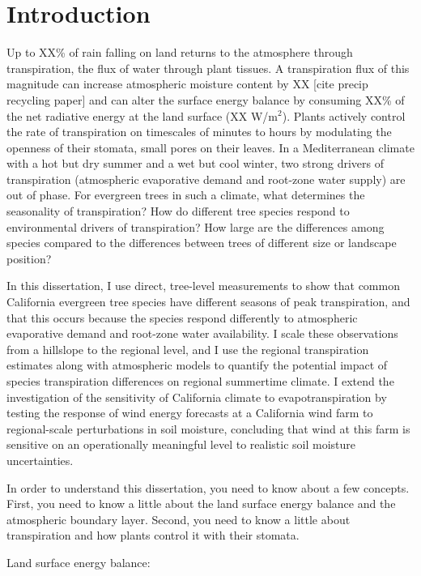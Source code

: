 \chapter{Introduction}
\label{c.intro}

Up to XX\% of rain falling on land returns to the atmosphere through transpiration, the flux of water through plant tissues.  A transpiration flux of this magnitude can increase atmospheric moisture content by XX [cite precip recycling paper] and can alter the surface energy balance by consuming XX\% of the net radiative energy at the land surface (XX W/m$^2$).  Plants actively control the rate of transpiration on timescales of minutes to hours by modulating the openness of their stomata, small pores on their leaves.  In a Mediterranean climate with a hot but dry summer and a wet but cool winter, two strong drivers of transpiration (atmospheric evaporative demand and root-zone water supply) are out of phase.  For evergreen trees in such a climate, what determines the seasonality of transpiration?  How do different tree species respond to environmental drivers of transpiration?  How large are the differences among species compared to the differences between trees of different size or landscape position?

In this dissertation, I use direct, tree-level measurements to show that common California evergreen tree species have different seasons of peak transpiration, and that this occurs because the species respond differently to atmospheric evaporative demand and root-zone water availability.  I scale these observations from a hillslope to the regional level, and I use the regional transpiration estimates along with atmospheric models to quantify the potential impact of species transpiration differences on regional summertime climate.  I extend the investigation of the sensitivity of California climate to evapotranspiration by testing the response of wind energy forecasts at a California wind farm to regional-scale perturbations in soil moisture, concluding that wind at this farm is sensitive on an operationally meaningful level to realistic soil moisture uncertainties.

In order to understand this dissertation, you need to know about a few concepts.  First, you need to know a little about the land surface energy balance and the atmospheric boundary layer.  Second, you need to know a little about transpiration and how plants control it with their stomata.

Land surface energy balance:


